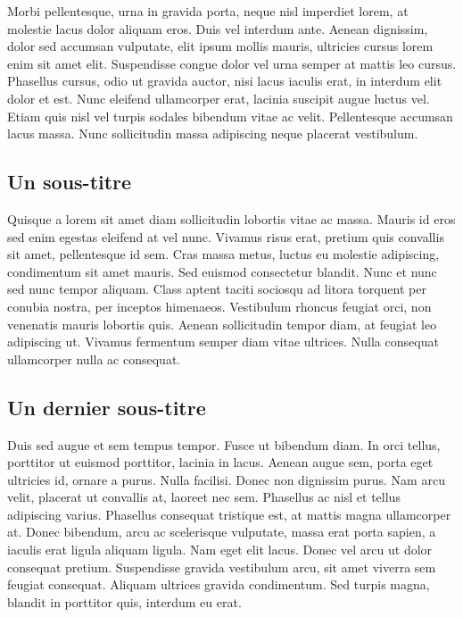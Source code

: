 Morbi pellentesque, urna in gravida porta, neque nisl imperdiet lorem, at
molestie lacus dolor aliquam eros. Duis vel interdum ante. Aenean dignissim,
dolor sed accumsan vulputate, elit ipsum mollis mauris, ultricies cursus
lorem enim sit amet elit. Suspendisse congue dolor vel urna semper at mattis
leo cursus. Phasellus cursus, odio ut gravida auctor, nisi lacus iaculis
erat, in interdum elit dolor et est. Nunc eleifend ullamcorper erat, lacinia
suscipit augue luctus vel. Etiam quis nisl vel turpis sodales bibendum vitae
ac velit. Pellentesque accumsan lacus massa. Nunc sollicitudin massa
adipiscing neque placerat vestibulum.

\subsection{Un sous-titre}

Quisque a lorem sit amet diam sollicitudin lobortis vitae ac massa. Mauris
id eros sed enim egestas eleifend at vel nunc. Vivamus risus erat, pretium
quis convallis sit amet, pellentesque id sem. Cras massa metus, luctus eu
molestie adipiscing, condimentum sit amet mauris. Sed euismod consectetur
blandit. Nunc et nunc sed nunc tempor aliquam. Class aptent taciti sociosqu
ad litora torquent per conubia nostra, per inceptos himenaeos. Vestibulum
rhoncus feugiat orci, non venenatis mauris lobortis quis. Aenean
sollicitudin tempor diam, at feugiat leo adipiscing ut. Vivamus fermentum
semper diam vitae ultrices. Nulla consequat ullamcorper nulla ac consequat.

\subsection{Un dernier sous-titre}

Duis sed augue et sem tempus tempor. Fusce ut bibendum diam. In orci tellus,
porttitor ut euismod porttitor, lacinia in lacus. Aenean augue sem, porta
eget ultricies id, ornare a purus. Nulla facilisi. Donec non dignissim
purus. Nam arcu velit, placerat ut convallis at, laoreet nec sem. Phasellus
ac nisl et tellus adipiscing varius. Phasellus consequat tristique est, at
mattis magna ullamcorper at. Donec bibendum, arcu ac scelerisque vulputate,
massa erat porta sapien, a iaculis erat ligula aliquam ligula. Nam eget elit
lacus. Donec vel arcu ut dolor consequat pretium. Suspendisse gravida
vestibulum arcu, sit amet viverra sem feugiat consequat. Aliquam ultrices
gravida condimentum. Sed turpis magna, blandit in porttitor quis, interdum
eu erat.

